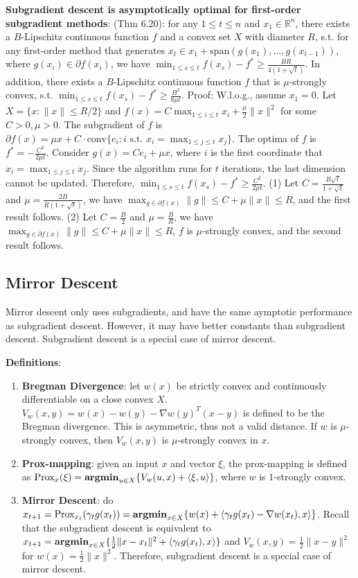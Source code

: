 \textbf{Subgradient descent is asymptotically optimal for first-order subgradient methods}: (Thm 6.20): for any $1\le t \le n$ and $x_1 \in \mathbb{R}^n$, there exists a $B$-Lipschitz continuous function $f$ and a convex set $X$ with diameter $R$, s.t. for any first-order method that generates $x_t \in x_1 + \text{span}(g(x_1), \dots, g(x_{t-1}))$, where $g(x_i) \in \partial f(x_i)$, we have $\min_{1\le s\le t}f(x_s) - f^* \ge \frac{BR}{4(1+\sqrt{t})}$. In addition, there exists a $B$-Lipschitz continuous function $f$ that is $\mu$-strongly convex, s.t. $\min_{1\le s\le t}f(x_s) - f^* \ge \frac{B^2}{8\mu t}$. Proof: W.l.o.g., assume $x_1=0$. Let $X = \{x:\|x\| \le R/2\}$ and $f(x) =  C\max_{1\le i\le t}x_i + \frac{\mu}{2}\|x\|^2$ for some $C>0, \mu >0$. The subgradient of $f$ is $\partial f(x) = \mu x + C \cdot \text{conv}\{e_i: i \text{ s.t. } x_i=\max_{1\le j \le t}x_j\}$. The optima of $f$ is $f^* = - \frac{C^2}{2\mu t}$. Consider $g(x)=Ce_i+\mu x$, where $i$ is the first coordinate that $x_i = \max_{1\le j \le t} x_j$. Since the algorithm runs for $t$ iterations, the last dimension cannot be updated. Therefore, $\min_{1\le s \le t}f(x_s) - f^* \ge \frac{C^2}{2\mu t}$. (1) Let $C = \frac{B\sqrt{t}}{1+\sqrt{t}}$ and $\mu = \frac{2B}{R(1+\sqrt{t})}$, we have $\max_{g \in \partial f(x)}\|g\| \le C + \mu \|x\|\le R$, and the first result follows. (2) Let $C=\frac{B}{2}$ and $\mu = \frac{B}{R}$, we have $\max_{g \in \partial f(x)}\|g\| \le C + \mu \|x\|\le R$, $f$ is $\mu$-strongly convex, and the second result follows.

\subsection{Mirror Descent}

Mirror descent only uses subgradients, and have the same aymptotic performance as subgradient descent. However, it may have better constants than subgradient descent. Subgradient descent is a special case of mirror descent.

\textbf{Definitions}:
\begin{enumerate}
    \item \textbf{Bregman Divergence}: let $w(x)$ be strictly convex and continuously differentiable on a close convex $X$. $V_w(x, y) = w(x) - w(y) - \nabla w(y)^T (x-y)$ is defined to be the Bregman divergence. This is asymmetric, thus not a valid distance. If $w$ is $\mu$-strongly convex, then $V_w(x, y)$ is $\mu$-strongly convex in $x$.
    \item \textbf{Prox-mapping}: given an input $x$ and vector $\xi$, the prox-mapping is defined as $\operatorname{Prox}_x(\xi) = \operatorname{\textbf{argmin}}_{u\in X}\{V_w(u, x) + \langle \xi, u \rangle\}$, where $w$ is $1$-strongly convex. 
    \item \textbf{Mirror Descent}: do $x_{t+1} = \operatorname{Prox}_{x_t}(\gamma_t g(x_t)) = \operatorname{\textbf{argmin}}_{x\in X}\{w(x)+\langle \gamma_t g(x_t)-\nabla w(x_t), x\rangle\}$. Recall that the subgradient descent is equivalent to $x_{t+1}=\operatorname{\textbf{argmin}}_{x \in X} \{\frac{1}{2}\|x-x_t\|^2 + \langle \gamma_t g(x_t), x\rangle\}$ and $V_w(x,y)=\frac{1}{2}\|x-y\|^2$ for $w(x) = \frac{1}{2}\|x\|^2$. Therefore, subgradient descent is a special case of mirror descent.
\end{enumerate}

